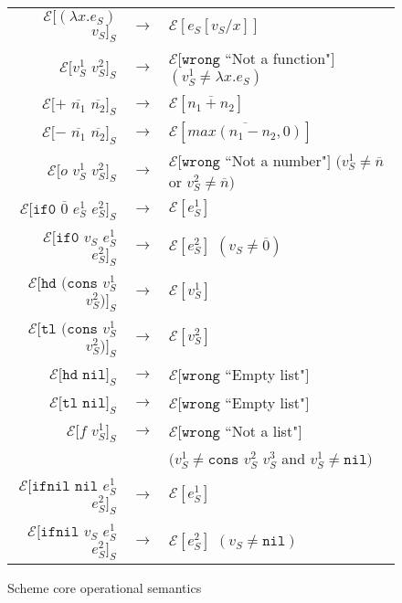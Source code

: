 \begin{figure}[p]
\label{scos}
\caption{Scheme core operational semantics}
\begin{center}
\begin{tabular}{rcl}
$\mathscr{E}[(\lambda x.e_{S})$ $v_{S}]_{S}$ & $\rightarrow$ & $\mathscr{E}[e_{S}[v_{S}/x]]$ \\
$\mathscr{E}[v_{S}^{1}$ $v_{S}^{2}]_{S}$ & $\rightarrow$ & $\mathscr{E}[\mathtt{wrong}$ ``Not a function"$]$ $(v_{S}^{1}\neq\lambda x.e_{S})$ \\
$\mathscr{E}[+$ $\overline{n_{1}}$ $\overline{n_{2}}]_{S}$ & $\rightarrow$ & $\mathscr{E}[\overline{n_{1}+n_{2}}]$ \\
$\mathscr{E}[-$ $\overline{n_{1}}$ $\overline{n_{2}}]_{S}$ & $\rightarrow$ & $\mathscr{E}[\overline{max(n_{1}-n_{2},0)}]$ \\
$\mathscr{E}[o$ $v_{S}^{1}$ $v_{S}^{2}]_{S}$ & $\rightarrow$ & $\mathscr{E}[\mathtt{wrong}$ ``Not a number"$]$ $(v_{S}^{1}\neq\overline{n}$ or $v_{S}^{2}\neq\overline{n})$ \\
$\mathscr{E}[\mathtt{if0}$ $\overline{0}$ $e_{S}^{1}$ $e_{S}^{2}]_{S}$ & $\rightarrow$ & $\mathscr{E}[e_{S}^{1}]$ \\
$\mathscr{E}[\mathtt{if0}$ $v_{S}$ $e_{S}^{1}$ $e_{S}^{2}]_{S}$ & $\rightarrow$ & $\mathscr{E}[e_{S}^{2}]$ $(v_{S}\neq\overline{0})$ \\
$\mathscr{E}[\mathtt{hd}$ $(\mathtt{cons}$ $v_{S}^{1}$ $v_{S}^{2})]_{S}$ & $\rightarrow$ & $\mathscr{E}[v_{S}^{1}]$ \\
$\mathscr{E}[\mathtt{tl}$ $(\mathtt{cons}$ $v_{S}^{1}$ $v_{S}^{2})]_{S}$ & $\rightarrow$ & $\mathscr{E}[v_{S}^{2}]$ \\
$\mathscr{E}[\mathtt{hd}$ $\mathtt{nil}]_{S}$ & $\rightarrow$ & $\mathscr{E}[\mathtt{wrong}$ ``Empty list"$]$ \\
$\mathscr{E}[\mathtt{tl}$ $\mathtt{nil}]_{S}$ & $\rightarrow$ & $\mathscr{E}[\mathtt{wrong}$ ``Empty list"$]$ \\
$\mathscr{E}[f$ $v_{S}^{1}]_{S}$ & $\rightarrow$ & $\mathscr{E}[\mathtt{wrong}$ ``Not a list"$]$ \\
&& $(v_{S}^{1}\neq\mathtt{cons}$ $v_{S}^{2}$ $v_{S}^{3}$ and $v_{S}^{1}\neq\mathtt{nil})$ \\
$\mathscr{E}[\mathtt{ifnil}$ $\mathtt{nil}$ $e_{S}^{1}$ $e_{S}^{2}]_{S}$ & $\rightarrow$ & $\mathscr{E}[e_{S}^{1}]$ \\
$\mathscr{E}[\mathtt{ifnil}$ $v_{S}$ $e_{S}^{1}$ $e_{S}^{2}]_{S}$ & $\rightarrow$ & $\mathscr{E}[e_{S}^{2}]$ $(v_{S}\neq\mathtt{nil})$ \\

\end{tabular}
\end{center}
\end{figure}
